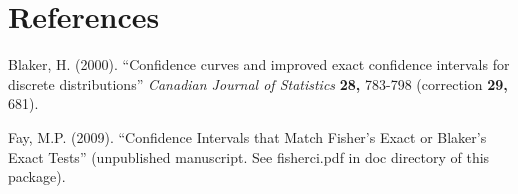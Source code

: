 \documentclass[12pt]{article}
\begin{document}
\section*{References}

\begin{description}
\item Blaker, H. (2000). ``Confidence curves and improved exact confidence intervals for discrete distributions''
{\it Canadian Journal of Statistics} {\bf 28,} 783-798 (correction {\bf 29,} 681).
\item Fay, M.P. (2009). ``Confidence Intervals that Match Fisher's Exact or Blaker's Exact Tests'' (unpublished manuscript. 
See fisherci.pdf in doc 
directory of this package).
\end{description}
\end{document}
